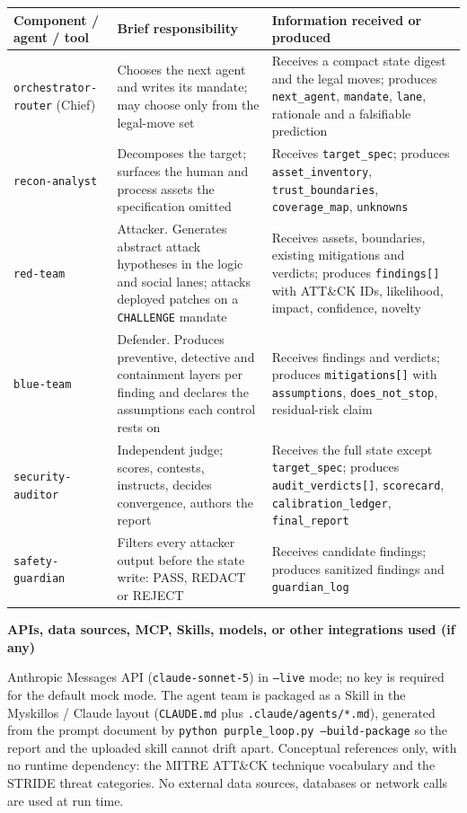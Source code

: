 \documentclass[11pt,a4paper]{article}
\newcommand{\qa}[2]{\textbf{#1}\par\vspace{-2pt}\begin{answerbox}#2\end{answerbox}}
\begin{document}
\begin{tabularx}{\linewidth}{@{}L{2.9cm}Y Y@{}}
\toprule
\textbf{Component / agent / tool} & \textbf{Brief responsibility} & \textbf{Information received or produced} \\
\midrule
\texttt{orchestrator-router} (Chief) &
Chooses the next agent and writes its mandate; may choose only from the legal-move set &
Receives a compact state digest and the legal moves; produces \texttt{next\_agent}, \texttt{mandate}, \texttt{lane}, rationale and a falsifiable prediction \\

\texttt{recon-analyst} &
Decomposes the target; surfaces the human and process assets the specification omitted &
Receives \texttt{target\_spec}; produces \texttt{asset\_inventory}, \texttt{trust\_boundaries}, \texttt{coverage\_map}, \texttt{unknowns} \\

\texttt{red-team} &
Attacker. Generates abstract attack hypotheses in the logic and social lanes; attacks deployed patches on a \texttt{CHALLENGE} mandate &
Receives assets, boundaries, existing mitigations and verdicts; produces \texttt{findings[]} with ATT\&CK IDs, likelihood, impact, confidence, novelty \\

\texttt{blue-team} &
Defender. Produces preventive, detective and containment layers per finding and declares the assumptions each control rests on &
Receives findings and verdicts; produces \texttt{mitigations[]} with \texttt{assumptions}, \texttt{does\_not\_stop}, residual-risk claim \\

\texttt{security-auditor} &
Independent judge; scores, contests, instructs, decides convergence, authors the report &
Receives the full state except \texttt{target\_spec}; produces \texttt{audit\_verdicts[]}, \texttt{scorecard}, \texttt{calibration\_ledger}, \texttt{final\_report} \\

\texttt{safety-guardian} &
Filters every attacker output before the state write: PASS, REDACT or REJECT &
Receives candidate findings; produces sanitized findings and \texttt{guardian\_log} \\
\bottomrule
\end{tabularx}

\qa{APIs, data sources, MCP, Skills, models, or other integrations used (if any)}{%
Anthropic Messages API (\texttt{claude-sonnet-5}) in \texttt{--live} mode; no key is
required for the default mock mode. The agent team is packaged as a Skill in the
Myskillos / Claude layout (\texttt{CLAUDE.md} plus \texttt{.claude/agents/*.md}), generated
from the prompt document by \texttt{python purple\_loop.py --build-package} so the report
and the uploaded skill cannot drift apart. Conceptual references only, with no runtime
dependency: the MITRE ATT\&CK technique vocabulary and the STRIDE threat categories. No
external data sources, databases or network calls are used at run time.}
\end{document}
